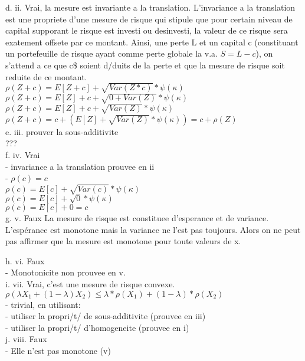 d. ii. Vrai, la mesure est invariante a la translation. L'invariance a la translation est une propriete d'une mesure de risque qui stipule que pour certain niveau de capital supporant le risque est investi ou desinvesti, la valeur de ce risque sera exatement offsete par ce montant. Ainsi, une perte L et un capital c (constituant un portefeuille de risque ayant comme perte globale la v.a. $S = L-c$), on s'attend a ce que c\$ soient d/duits de la perte et que la mesure de risque soit reduite de ce montant. \\

$\rho(Z+c) = E[Z+c] + \sqrt{Var(Z*c)} * \psi(\kappa)$\\
$\rho(Z+c) = E[Z]+c + \sqrt{0+Var(Z)} * \psi(\kappa)$\\
$\rho(Z+c) = E[Z]+c + \sqrt{Var(Z)} * \psi(\kappa)$\\
$\rho(Z+c) = c + (E[Z] + \sqrt{Var(Z)} * \psi(\kappa)) = c + \rho(Z)$\\

e. iii. prouver la sous-additivite\\
???\\

f. iv. Vrai \\
- invariance a la translation prouvee en ii\\
- $\rho(c) = c$\\

$\rho(c) = E[c] + \sqrt{Var(c)} * \psi(\kappa)$\\
$\rho(c) = E[c] + \sqrt{0} * \psi(\kappa)$\\
$\rho(c) = E[c] + 0 = c$\\

g. v. Faux
La mesure de risque est constituee d'esperance et de variance. L'espérance est monotone mais la variance ne l'est pas toujours. Alors on ne peut pas affirmer que la mesure est monotone pour toute valeurs de x. 

h. vi. Faux\\
- Monotonicite non prouvee en v.\\

i. vii. Vrai, c'est une mesure de risque convexe. \\
$\rho(\lambda X_1 + (1-\lambda)X_2) \leq \lambda*\rho(X_1) + (1-\lambda)*\rho(X_2)$\\
- trivial, en utilisant:\\
- utiliser la propri/t/ de sous-additivite (prouvee en iii)\\
- utiliser la propri/t/ d'homogeneite (prouvee en i)\\

j. viii. Faux\\
- Elle n'est pas monotone (v)\\
